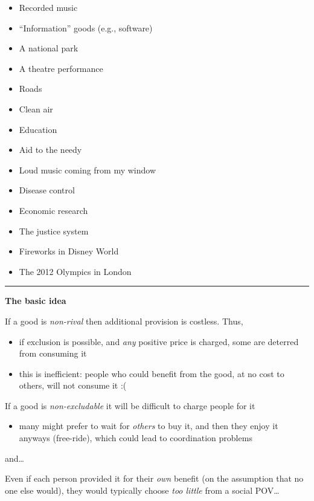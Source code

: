 \documentclass[]{article}
\providecommand{\tightlist}{%
  \setlength{\itemsep}{0pt}\setlength{\parskip}{0pt}}
\begin{document}
\begin{itemize}
\tightlist
\item
  Recorded music
\item
  ``Information'' goods (e.g., software)
\item
  A national park
\item
  A theatre performance
\item
  Roads
\item
  Clean air
\item
  Education
\item
  Aid to the needy
\item
  Loud music coming from my window
\item
  Disease control
\item
  Economic research
\item
  The justice system
\item
  Fireworks in Disney World
\item
  The 2012 Olympics in London
\end{itemize}

\begin{center}\rule{0.5\linewidth}{\linethickness}\end{center}

\textbf{The basic idea}

If a good is \emph{non-rival} then additional provision is costless.
Thus,

\begin{itemize}
\tightlist
\item
  if exclusion is possible, and \emph{any} positive price is charged,
  some are deterred from consuming it
\item
  this is inefficient: people who could benefit from the good, at no
  cost to others, will not consume it :(
\end{itemize}

If a good is \emph{non-excludable} it will be difficult to charge people
for it

\begin{itemize}
\tightlist
\item
  many might prefer to wait for \emph{others} to buy it, and then they
  enjoy it anyways (free-ride), which could lead to coordination
  problems
\end{itemize}

and\ldots{}

\bigskip

Even if each person provided it for their \emph{own} benefit (on the
assumption that no one else would), they would typically choose
\emph{too little} from a social POV\ldots{}
\end{document}
